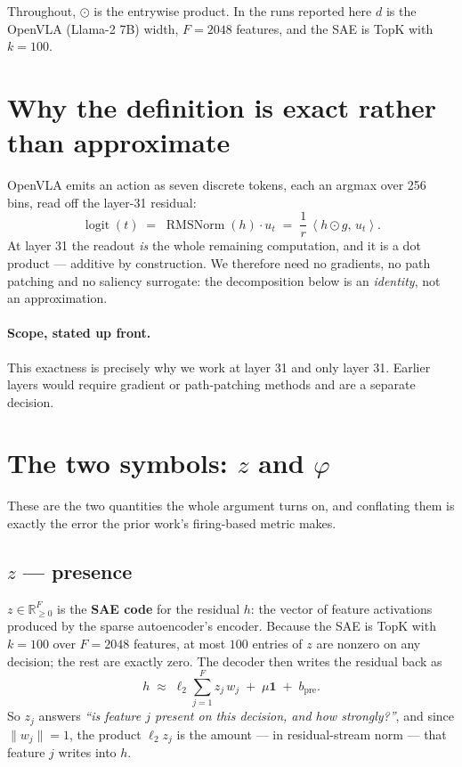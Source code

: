 \documentclass[11pt]{article}
\newcommand{\Rb}{\mathbb{R}}
\newcommand{\ip}[2]{\left\langle #1,\, #2 \right\rangle}
\newcommand{\bpre}{b_{\mathrm{pre}}}
\begin{document}
\noindent
Throughout, $\odot$ is the entrywise product. In the runs reported here $d$ is the OpenVLA
(Llama-2 7B) width, $F=2048$ features, and the SAE is TopK with $k=100$.

\section{Why the definition is exact rather than approximate}
\label{sec:exact}

OpenVLA emits an action as seven discrete tokens, each an argmax over 256 bins, read off the
layer-31 residual:
\begin{equation}
\operatorname{logit}(t) \;=\; \operatorname{RMSNorm}(h)\cdot u_t
\;=\; \frac{1}{r}\,\ip{h \odot g}{u_t}.
\label{eq:readout}
\end{equation}
At layer 31 the readout \emph{is} the whole remaining computation, and it is a dot product ---
additive by construction. We therefore need no gradients, no path patching and no saliency
surrogate: the decomposition below is an \emph{identity}, not an approximation.

\paragraph{Scope, stated up front.} This exactness is precisely why we work at layer 31 and
only layer 31. Earlier layers would require gradient or path-patching methods and are a
separate decision.

\section{The two symbols: \texorpdfstring{$z$}{z} and \texorpdfstring{$\varphi$}{phi}}
\label{sec:zphi}

These are the two quantities the whole argument turns on, and conflating them is exactly the
error the prior work's firing-based metric makes.

\subsection{\texorpdfstring{$z$}{z} --- presence}

$z\in\Rb_{\ge0}^{F}$ is the \textbf{SAE code} for the residual $h$: the vector of feature
activations produced by the sparse autoencoder's encoder. Because the SAE is TopK with
$k=100$ over $F=2048$ features, at most $100$ entries of $z$ are nonzero on any decision;
the rest are exactly zero. The decoder then writes the residual back as
\begin{equation}
h \;\approx\; \ell_2 \sum_{j=1}^{F} z_j\, w_j \;+\; \mu\mathbf{1} \;+\; \bpre .
\label{eq:sae}
\end{equation}
So $z_j$ answers \emph{``is feature $j$ present on this decision, and how strongly?''}, and
since $\|w_j\|=1$, the product $\ell_2 z_j$ is the amount --- in residual-stream norm --- that
feature $j$ writes into $h$.
\end{document}
